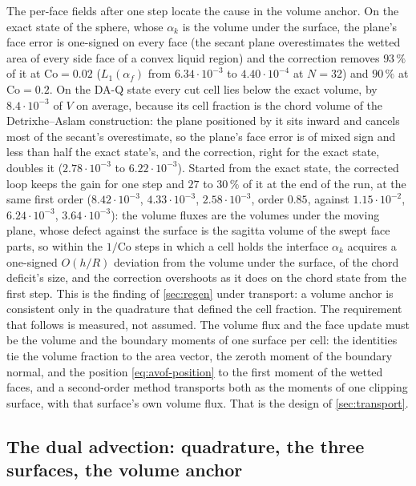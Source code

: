 \documentclass[preprint,12pt]{elsarticle}
\begin{document}
The per-face fields after one step locate the cause in the volume anchor. On the exact state of the sphere, whose $\alpha_k$ is the volume under the surface, the plane's face error is one-signed on every face (the secant plane overestimates the wetted area of every side face of a convex liquid region) and the correction removes $93\,\%$ of it at $\mathrm{Co} = 0.02$ ($L_1(\alpha_f)$ from $6.34\cdot10^{-3}$ to $4.40\cdot10^{-4}$ at $N = 32$) and $90\,\%$ at $\mathrm{Co} = 0.2$. On the DA-Q state every cut cell lies below the exact volume, by $8.4\cdot10^{-3}$ of $V$ on average, because its cell fraction is the chord volume of the Detrixhe--Aslam construction: the plane positioned by it sits inward and cancels most of the secant's overestimate, so the plane's face error is of mixed sign and less than half the exact state's, and the correction, right for the exact state, doubles it ($2.78\cdot10^{-3}$ to $6.22\cdot10^{-3}$). Started from the exact state, the corrected loop keeps the gain for one step and $27$ to $30\,\%$ of it at the end of the run, at the same first order ($8.42\cdot10^{-3}$, $4.33\cdot10^{-3}$, $2.58\cdot10^{-3}$, order $0.85$, against $1.15\cdot10^{-2}$, $6.24\cdot10^{-3}$, $3.64\cdot10^{-3}$): the volume fluxes are the volumes under the moving plane, whose defect against the surface is the sagitta volume of the swept face parts, so within the $1/\mathrm{Co}$ steps in which a cell holds the interface $\alpha_k$ acquires a one-signed $O(h/R)$ deviation from the volume under the surface, of the chord deficit's size, and the correction overshoots as it does on the chord state from the first step. This is the finding of \cref{sec:regen} under transport: a volume anchor is consistent only in the quadrature that defined the cell fraction. The requirement that follows is measured, not assumed. The volume flux and the face update must be the volume and the boundary moments of one surface per cell: the identities tie the volume fraction to the area vector, the zeroth moment of the boundary normal, and the position \cref{eq:avof-position} to the first moment of the wetted faces, and a second-order method transports both as the moments of one clipping surface, with that surface's own volume flux. That is the design of \cref{sec:transport}.

\subsection{The dual advection: quadrature, the three surfaces, the volume anchor}
\label{app:tpf-dual}
\end{document}
